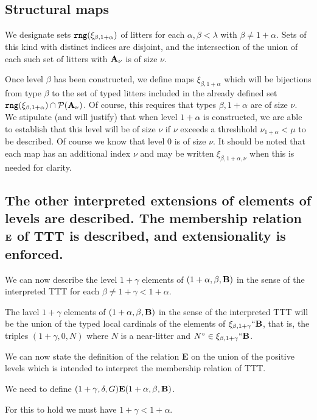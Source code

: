 \documentclass[12pt]{article}
\begin{document}
\subsection{Structural maps}

We designate sets ${\tt rng}(\xi_{\beta,1+\alpha})$ of litters for each $\alpha, \beta <\lambda$ with $\beta \neq 1+\alpha$.  Sets of this kind with distinct indices are disjoint,
and the intersection of the union of each such set of litters with ${\bf A}_\nu$ is of size $\nu$.

Once level $\beta$ has been constructed, we define maps $\xi_{\beta,1+\alpha}$ which will be bijections from type $\beta$ to the set of typed litters included in the already defined set
${\tt rng}(\xi_{\beta,1+\alpha})\cap {\cal P}({\bf A}_\nu)$.  Of course, this requires that types $\beta,1+\alpha$ are of size $\nu$.  We stipulate (and will justify) that when
level $1+\alpha$ is constructed, we are able to establish that this level will be of size $\nu$ if $\nu$ exceeds a threshhold $\nu_{1+\alpha}<\mu$ to be described.  Of course we know that level 0 is of size $\nu$.  It should be noted that each map has an additional index $\nu$ and may be written $\xi_{\beta,1+\alpha,\nu}$ when this is needed for clarity.

\subsection{The other interpreted extensions of elements of levels are described.  The membership relation ${\bf E}$ of TTT is described, and extensionality is enforced.}

We can now describe the level $1+\gamma$ elements of $(1+\alpha,\beta,{\bf B})$ in the sense of the interpreted TTT for each $\beta \neq 1+\gamma <1+\alpha$.

The lavel $1+\gamma$ elements of $(1+\alpha,\beta,{\bf B})$ in the sense of the interpreted TTT will be the union of the typed local cardinals of the elements of $\xi_{\beta,1+\gamma}``{\bf B}$, that is, the triples $(1+\gamma,0,N)$ where $N$ is a near-litter and $N^\circ \in \xi_{\beta,1+\gamma}``{\bf B}$.

We can now state the definition of the relation {\bf E} on the union of the positive levels which is intended to interpret the membership relation of TTT.  

We need to define
$(1+\gamma,\delta,G) {\bf E} (1+\alpha,\beta,{\bf B})$.  

For this to hold we must have $1+\gamma<1+\alpha$.  
\end{document}
